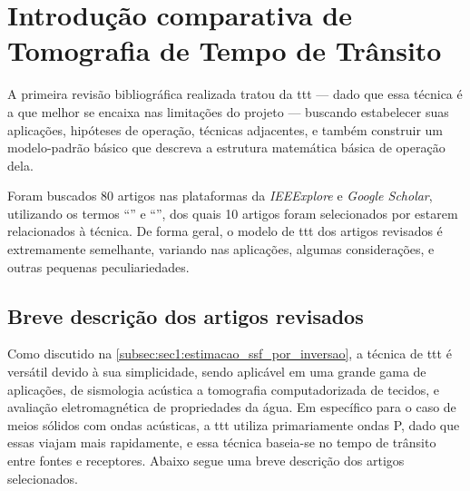 \section{Introdução comparativa de Tomografia de Tempo de Trânsito}
\label{sec:travel-time_tomography}

A primeira revisão bibliográfica realizada tratou da \gls{ttt} --- dado que essa técnica é a que melhor se encaixa nas limitações do projeto --- buscando estabelecer suas aplicações, hipóteses de operação, técnicas adjacentes, e também construir um modelo-padrão básico que descreva a estrutura matemática básica de operação dela.

Foram buscados 80 artigos nas plataformas da \textsl{IEEExplore} e \textsl{Google Scholar}, utilizando os termos ``'' e ``'', dos quais 10 artigos foram selecionados por estarem relacionados à técnica. De forma geral, o modelo de \gls{ttt} dos artigos revisados é extremamente semelhante, variando nas aplicações, algumas considerações, e outras pequenas peculiariedades.

\subsection{Breve descrição dos artigos revisados}
\label{sec_ttt:subsec_revisao}
Como discutido na \cref{subsec:sec1:estimacao_ssf_por_inversao}, a técnica de \gls{ttt} é versátil devido à sua simplicidade, sendo aplicável em uma grande gama de aplicações, de sismologia acústica a tomografia computadorizada de tecidos, e avaliação eletromagnética de propriedades da água. Em específico para o caso de meios sólidos com ondas acústicas, a \gls{ttt} utiliza primariamente ondas P, dado que essas viajam mais rapidamente, e essa técnica baseia-se no tempo de trânsito entre fontes e receptores. Abaixo segue uma breve descrição dos artigos selecionados.

